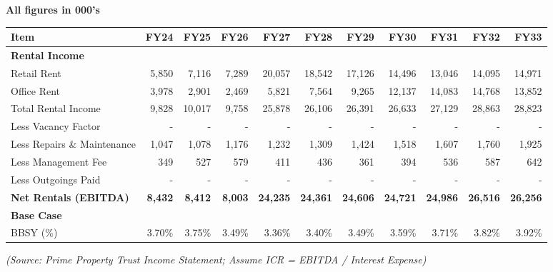 \documentclass[11pt, a4paper, british]{article}
\begin{document}
\begin{tcolorbox}[
    enhanced,
    breakable,
    title={Prime Property Trust - Income Statement},
    colback=cream,
    colframe=headercolor,
    coltitle=white,
    fonttitle=\bfseries,
    boxed title style={
        sharp corners=north,
        rounded corners=south,
        colframe=headercolor,
        colback=headercolor,
    },
    arc=3mm,
    boxrule=0.5mm,
    before skip=10pt,
    after skip=10pt,
    left=5pt,
    right=5pt,
    top=5pt,
    bottom=5pt,
]
\centering
\textbf{All figures in 000's}
\vspace{5pt}
\footnotesize %
\setlength{\tabcolsep}{2pt} %
\begin{tabular}{l *{10}{r}} %
\toprule
\textbf{Item} & \textbf{FY24} & \textbf{FY25} & \textbf{FY26} & \textbf{FY27} & \textbf{FY28} & \textbf{FY29} & \textbf{FY30} & \textbf{FY31} & \textbf{FY32} & \textbf{FY33} \\
\midrule
\textbf{Rental Income} &  &  &  &  &  &  &  &  &  &  \\
Retail Rent & 5,850 & 7,116 & 7,289 & 20,057 & 18,542 & 17,126 & 14,496 & 13,046 & 14,095 & 14,971 \\
Office Rent & 3,978 & 2,901 & 2,469 & 5,821 & 7,564 & 9,265 & 12,137 & 14,083 & 14,768 & 13,852 \\
Total Rental Income & 9,828 & 10,017 & 9,758 & 25,878 & 26,106 & 26,391 & 26,633 & 27,129 & 28,863 & 28,823 \\
\midrule
Less Vacancy Factor & - & - & - & - & - & - & - & - & - & - \\
Less Repairs \& Maintenance & 1,047 & 1,078 & 1,176 & 1,232 & 1,309 & 1,424 & 1,518 & 1,607 & 1,760 & 1,925 \\
Less Management Fee & 349 & 527 & 579 & 411 & 436 & 361 & 394 & 536 & 587 & 642 \\
Less Outgoings Paid & - & - & - & - & - & - & - & - & - & - \\
\midrule[\heavyrulewidth]
\textbf{Net Rentals (EBITDA)} & \textbf{8,432} & \textbf{8,412} & \textbf{8,003} & \textbf{24,235} & \textbf{24,361} & \textbf{24,606} & \textbf{24,721} & \textbf{24,986} & \textbf{26,516} & \textbf{26,256} \\
\midrule
\textbf{Base Case} &  &  &  &  &  &  &  &  &  &  \\
BBSY (\%) & 3.70\% & 3.75\% & 3.49\% & 3.36\% & 3.40\% & 3.49\% & 3.59\% & 3.71\% & 3.82\% & 3.92\% \\
\bottomrule
\end{tabular}
\vspace{5pt}
\footnotesize \textit{(Source: Prime Property Trust Income Statement; Assume ICR = EBITDA / Interest Expense)}
\end{tcolorbox}
\end{document}
